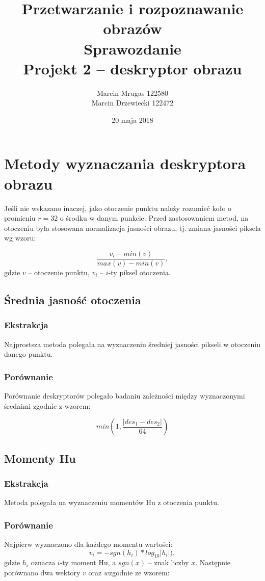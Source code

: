 \documentclass[a4paper,11pt]{article}
\author{Marcin Mrugas 122580 \\
		Marcin Drzewiecki 122472}
\title{Przetwarzanie i rozpoznawanie obrazów\\ 
\large{{\bf Sprawozdanie} \\ Projekt 2 -- deskryptor obrazu}}
\date{20 maja 2018}
\begin{document}
\maketitle 

\section{Metody wyznaczania deskryptora obrazu}

Jeśli nie wskazano inaczej, jako otoczenie punktu należy rozumieć koło o promieniu $ r = 32 $ o środku w danym punkcie.
Przed zastosowaniem metod, na otoczeniu była stosowana normalizacja jasności obrazu, tj. zmiana jasności piksela wg wzoru:

$$ \frac{v_i - min(v)}{max(v)-min(v)},$$
gdzie $v$ -- otoczenie punktu, $v_i$ -- $i$-ty piksel otoczenia.

\subsection{Średnia jasność otoczenia}

\subsubsection{Ekstrakcja}
Najprostsza metoda polegała na wyznaczeniu średniej jasności pikseli w otoczeniu danego punktu.

\subsubsection{Porównanie}
Porównanie deskryptorów polegało badaniu zależności między wyznaczonymi średnimi zgodnie z wzorem:

$$ min(1, \frac{|des_1 - des_2|}{64}) $$

\subsection{Momenty Hu}

\subsubsection{Ekstrakcja}
Metoda polegała na wyznaczeniu momentów Hu z otoczenia punktu. 

\subsubsection{Porównanie}
Najpierw wyznaczono dla każdego momentu wartości:
$$ v_i = -sgn(h_i) * log_{10}|h_i|), $$
gdzie $h_i$ oznacza $i$-ty moment Hu, a $sgn(x)$ -- znak liczby $x$.
Następnie porównano dwa wektory $v$ oraz $w$zgodnie ze wzorem:
\end{document}
